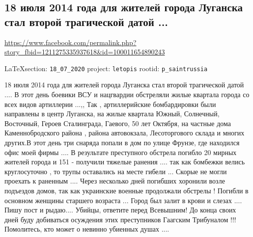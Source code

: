  
 
\subsection{18 июля 2014 года для жителей города Луганска стал второй трагической датой ...}
\url{https://www.facebook.com/permalink.php?story_fbid=1211275335937618&id=100011654890243}
  
\vspace{0.5cm}
{\small\LaTeX section: \verb|18_07_2020| project: \verb|letopis| rootid: \verb|p_saintrussia|}
\vspace{0.5cm}

18 июля 2014 года для жителей города Луганска стал второй трагической датой
.... В этот день боевики ВСУ и нацгвардии обстреляли жилые квартала города со
всех видов артиллерии ...,, Так , артиллерийские бомбардировки были направлены
в центр Луганска, на жилые квартала Южный, Солнечный, Восточный, Героев
Сталинграда, Гаевого, 50 лет Октября, на частные дома Каменнобродского района ,
района автовокзала, Лесоторгового склада и многих других.В этот день три
снаряда попали в дом по улице Фрунзе, где находился офис моей фирмы .... В
результате преступного обстрела погибло 20 мирных жителей города и 151 -
получили тяжелые ранения .... так как бомбежки велись круглосуточно , то трупы
оставались на месте гибели ... Скорые не могли проехать к раненным .... Через
несколько дней погибших хоронили возле подъездов домов, так как украинские
военные продолжали обстрелы ! Погибли в основном женщины старшего возраста ...
Город был залит в крови и слезах .... Пишу пост и рыдаю.... Убийцы, ответите
перед Всевышним! До конца своих дней буду добиваться осуждения этих
преступников Гаагским Трибуналом !!! Помолитесь, кто может о невинно убиенных
душах ....
  
